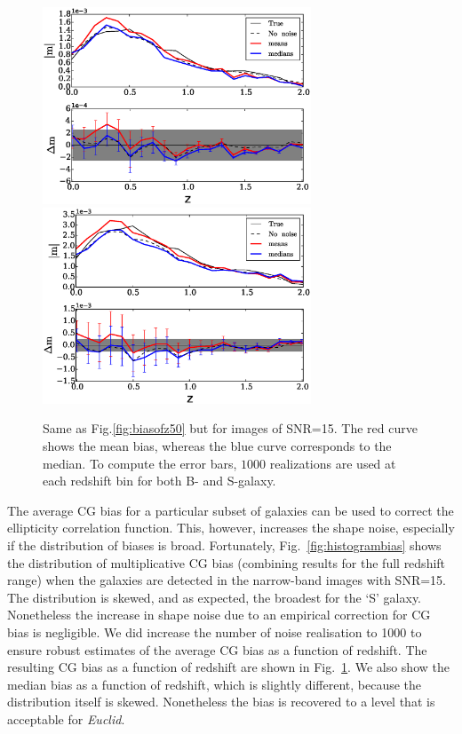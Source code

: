 \documentclass[useAMS,usenatbib]{mnras}
\begin{document}
\begin{figure}
  \includegraphics[width=8.0cm]{zs2n_b_snrtt15_medians.eps}
  \includegraphics[width=8.0cm]{zs2n_s_snrtt15_medians.eps}
\caption{Same as Fig.\ref{fig:biasofz50} but for images of SNR=15.
The red curve shows the mean bias, whereas the blue curve corresponds to the median.
To compute the error bars, $1000$ realizations are used at each redshift bin for both B- and
  S-galaxy.}
\label{fig:biasofz15}
\end{figure}
%

The average CG bias for a particular subset of galaxies can be used to correct the ellipticity correlation function. This, however, increases the shape noise, especially if the distribution of biases is broad. 
Fortunately, Fig.~\ref{fig:histogrambias} shows the distribution of multiplicative CG bias (combining results for the full redshift range) when the galaxies are detected in the narrow-band images with SNR=15.
The distribution is skewed, and as expected, the broadest for the `S' galaxy. Nonetheless the increase in shape noise due to an empirical correction for CG bias is negligible. We did increase the number of noise realisation to 1000 to ensure robust estimates of the average CG bias as a function of redshift. The resulting CG bias as a function of redshift are shown in Fig.~\ref{fig:biasofz15}. We also show the median bias as a function of redshift, which is slightly different, because the distribution itself is skewed. Nonetheless the bias is recovered to a level that is acceptable for {\it Euclid}. 
\end{document}
